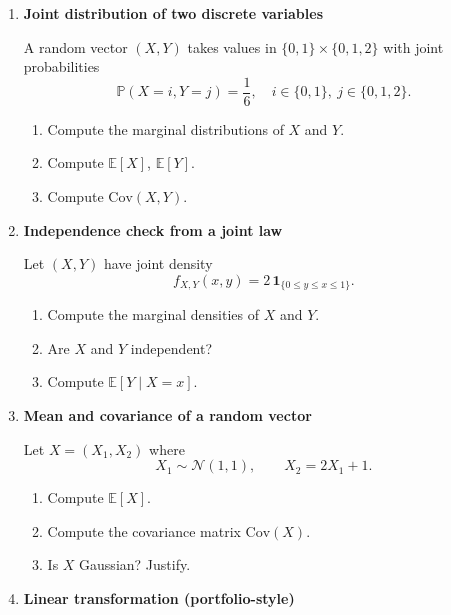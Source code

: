 \documentclass[11pt]{article}
\begin{document}
\begin{enumerate}

\item \textbf{Joint distribution of two discrete variables}

A random vector $(X,Y)$ takes values in $\{0,1\}\times\{0,1,2\}$ with joint probabilities
\[
\mathbb{P}(X=i,Y=j)=\frac{1}{6}, \quad i\in\{0,1\},\ j\in\{0,1,2\}.
\]

\begin{enumerate}
\item Compute the marginal distributions of $X$ and $Y$.
\item Compute $\mathbb{E}[X]$, $\mathbb{E}[Y]$.
\item Compute $\mathrm{Cov}(X,Y)$.
\end{enumerate}

\bigskip

\item \textbf{Independence check from a joint law}

Let $(X,Y)$ have joint density
\[
f_{X,Y}(x,y)=2\,\mathbf{1}_{\{0\le y\le x\le 1\}}.
\]

\begin{enumerate}
\item Compute the marginal densities of $X$ and $Y$.
\item Are $X$ and $Y$ independent?
\item Compute $\mathbb{E}[Y\mid X=x]$.
\end{enumerate}

\bigskip

\item \textbf{Mean and covariance of a random vector}

Let $X=(X_1,X_2)$ where
\[
X_1\sim\mathcal{N}(1,1),\qquad X_2=2X_1+1.
\]

\begin{enumerate}
\item Compute $\mathbb{E}[X]$.
\item Compute the covariance matrix $\mathrm{Cov}(X)$.
\item Is $X$ Gaussian? Justify.
\end{enumerate}

\bigskip

\item \textbf{Linear transformation (portfolio-style)}


\end{enumerate}
\end{document}
